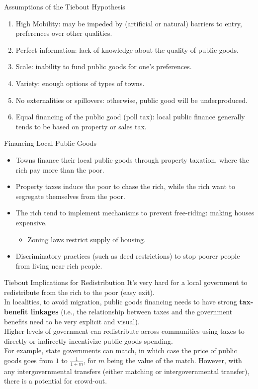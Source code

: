 \documentclass[8pt]{extarticle}
\begin{document}
  \begin{problem}{Assumptions of the Tiebout Hypothesis}
    \begin{enumerate}[(1)]
      \item High Mobility: may be impeded by (artificial or natural) barriers to entry, preferences over other qualities.
      \item Perfect information: lack of knowledge about the quality of public goods.
      \item Scale: inability to fund public goods for one's preferences.
      \item Variety: enough options of types of towns.
      \item No externalities or spillovers: otherwise, public good will be underproduced.
      \item Equal financing of the public good (poll tax): local public finance generally tends to be based on property or sales tax.
    \end{enumerate}
  \end{problem}
  \begin{problem}{Financing Local Public Goods}
    \begin{itemize}
      \item Towns finance their local public goods through property taxation, where the rich pay more than the poor.
      \item Property taxes induce the poor to chase the rich, while the rich want to segregate themselves from the poor.
      \item The rich tend to implement mechanisms to prevent free-riding: making houses expensive.
        \begin{itemize}
          \item Zoning laws restrict supply of housing.
        \end{itemize}
      \item Discriminatory practices (such as deed restrictions) to stop poorer people from living near rich people.
    \end{itemize}
  \end{problem}
  \begin{problem}{Tiebout Implications for Redistribution}
    It's very hard for a local government to redistribute from the rich to the poor (easy exit).\\

    In localities, to avoid migration, public goods financing needs to have strong \textbf{tax-benefit linkages} (i.e., the relationship between taxes and the government benefits need to be very explicit and visual).\\

    Higher levels of government can redistribute across communities using taxes to directly or indirectly incentivize public goods spending.\\

    For example, state governments can match, in which case the price of public goods goes from $1$ to  $\frac{1}{1+m}$, for $m$ being the value of the match. However, with any intergovernmental transfers (either matching or intergovernmental transfer), there is a potential for crowd-out.
  \end{problem}
\end{document}
